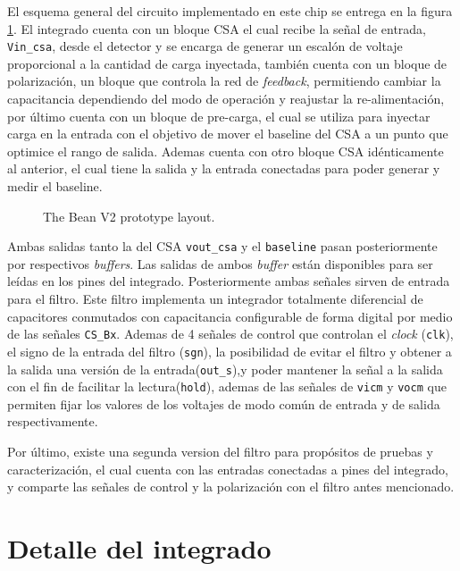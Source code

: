 \documentclass[11pt,letterpaper,spanish]{article}
\begin{document}
El esquema general del circuito implementado en este chip se entrega en la figura \ref{thebean}. El integrado cuenta con un bloque CSA el cual recibe la señal de entrada, \verb+Vin_csa+, desde el detector y se encarga de generar un escalón de voltaje proporcional a la cantidad de carga inyectada, también cuenta con un bloque de polarización, un bloque que controla la red de \textit{feedback}, permitiendo cambiar la capacitancia dependiendo del modo de operación y reajustar la re-alimentación, por último cuenta con un bloque de pre-carga, el cual se utiliza para inyectar carga en la entrada con el objetivo de mover el baseline del CSA a un punto que optimice el rango de salida. Ademas cuenta con otro bloque CSA idénticamente al anterior, el cual tiene la salida y la entrada conectadas para poder generar y medir el baseline.

\begin{figure}[!t]
	
	\caption{\label{thebean}The Bean V2 prototype layout.}
\end{figure}

Ambas salidas tanto la del CSA \verb+vout_csa+ y el \verb+baseline+ pasan posteriormente por respectivos \textit{buffers}. Las salidas de ambos \textit{buffer} están disponibles para ser leídas en los pines del integrado. Posteriormente ambas señales sirven de entrada para el filtro. Este filtro implementa un integrador totalmente diferencial de capacitores conmutados con capacitancia configurable de forma digital por medio de las señales \verb+CS_Bx+. Ademas de 4 señales de control que controlan el \textit{clock} (\verb+clk+), el signo de la entrada del filtro (\verb+sgn+), la posibilidad de evitar el filtro y obtener a la salida una versión de la entrada(\verb+out_s+),y poder mantener la señal a la salida con el fin de facilitar la lectura(\verb+hold+), ademas de las señales de \verb+vicm+ y \verb+vocm+ que permiten fijar los valores de los voltajes de modo común de entrada y de salida respectivamente. 

Por último, existe una segunda version del filtro para propósitos de pruebas y caracterización, el cual cuenta con las entradas conectadas a pines del integrado, y comparte las señales de control y la polarización con el filtro antes mencionado.

\section{Detalle del integrado}
 
\end{document}
